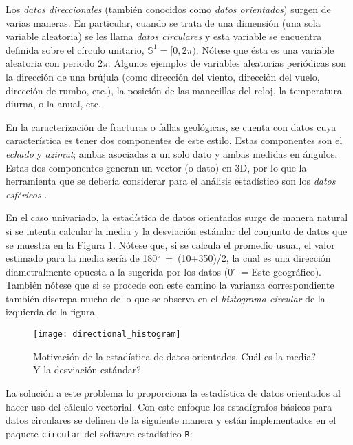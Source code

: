 Los \emph{datos direccionales} (tambi\'en conocidos como \emph{datos orientados}) surgen de varias maneras. En particular, cuando se trata de una dimensi\'on (una sola variable aleatoria) se les llama \emph{datos circulares} y esta variable se encuentra definida sobre el c\'irculo unitario, \(\mathbb{S}^{1} = [0, 2 \pi) \). N\'otese que \'esta es una variable aleatoria con periodo \(2\pi\). Algunos ejemplos de variables aleatorias peri\'odicas son la direcci\'on de una br\'ujula (como direcci\'on del viento, direcci\'on del vuelo, direcci\'on de rumbo, etc.), la posici\'on de las manecillas del reloj, la temperatura diurna, o la anual, etc.

En la caracterizaci\'on de fracturas o fallas geol\'ogicas, se cuenta con datos cuya caracter\'istica es tener dos componentes de este estilo. Estas componentes son el \emph{echado} y \emph{azimut}; ambas asociadas a un solo dato y ambas medidas en \'angulos. Estas dos componentes generan un vector (o dato) en 3D, por lo que la herramienta que se deber\'ia considerar para el an\'alisis estad\'istico son los \emph{datos esf\'ericos} \cite{fisher_statistical_1993,jammalamadaka_topics_2001}.

En el caso univariado, la estad\'istica de datos orientados surge de manera natural si se intenta calcular la media y la desviaci\'on est\'andar del conjunto de datos que se muestra en la Figura 1. N\'otese que, si se calcula el promedio usual, el valor estimado para la media ser\'ia de 180$^\circ$~=~(10+350)/2, la cual es una direcci\'on diametralmente opuesta a la sugerida por los datos (0$^\circ$~= Este geogr\'afico). Tambi\'en n\'otese que si se procede con este camino la varianza correspondiente tambi\'en discrepa mucho de lo que se observa en el \emph{histograma circular} de la izquierda de la figura.


\begin{figure}[H]
	\centering 
\texttt{[image: directional\_histogram]}
	\caption{Motivaci\'on de la estad\'istica de datos orientados. \textquestiondown Cu\'al es la media? \textquestiondown Y la desviaci\'on est\'andar?}
	\label{f:directionalHist}
\end{figure}

La soluci\'on a este problema lo proporciona la estad\'istica de datos orientados al hacer uso del c\'alculo vectorial. Con este enfoque los estad\'igrafos b\'asicos para datos circulares se definen de la siguiente manera \citep[ch. 2]{mardia_directional_2000} y est\'an implementados en el paquete \verb|circular| del software estad\'istico \verb|R|:

